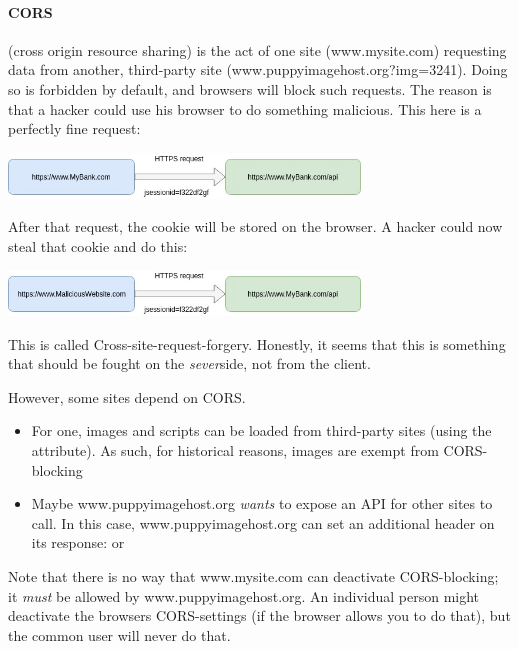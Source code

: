 \paragraph{CORS} (cross origin resource sharing) is the act of one site (www.mysite.com) requesting data from another, third-party site (www.puppyimagehost.org?img=3241). Doing so is forbidden by default, and browsers will block such requests. The reason is that a hacker could use his browser to do something malicious. This here is a perfectly fine request: 

\includegraphics[width=0.7\textwidth]{images/cookie_3.jpg}

After that request, the  cookie will be stored on the browser. A hacker could now steal that cookie and do this: 

\includegraphics[width=0.7\textwidth]{images/cookie_4.jpg}

This is called Cross-site-request-forgery. Honestly, it seems that this is something that should be fought on the \emph{sever}side, not from the client.


However, some sites depend on CORS.
\begin{itemize}
	\item For one, images and scripts can be loaded from third-party sites (using the  attribute). As such, for historical reasons, images are exempt from CORS-blocking
	\item Maybe www.puppyimagehost.org \emph{wants} to expose an API for other sites to call. In this case, www.puppyimagehost.org can set an additional header on its response:  or 
\end{itemize}
Note that there is no way that www.mysite.com can deactivate CORS-blocking; it \emph{must} be allowed by www.puppyimagehost.org. An individual person might deactivate the browsers CORS-settings (if the browser allows you to do that), but the common user will never do that. 

